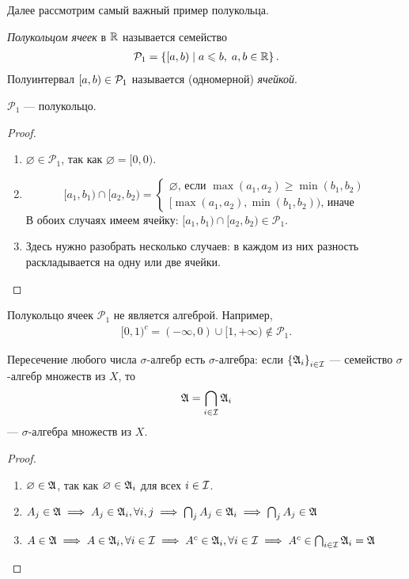 Далее рассмотрим самый важный пример полукольца.

\begin{df}
 \textit{Полукольцом ячеек} в $\mathbb{R}$ называется семейство 
 \begin{align*}
  \mathcal{P}_1 = \left\{ [a, b) \mid a \leqslant b,\; a, b \in \mathbb{R} \right\} 
 .\end{align*} Полуинтервал $[a, b) \in \mathcal{P}_1$ называется (одномерной) \textit{ячейкой}.
\end{df}
\begin{lm}
 $ \mathcal{P}_1 $ --- полукольцо.
\end{lm}
\begin{proof}\
 \begin{enumerate}
  \item $ \varnothing \in \mathcal{P}_1 $, так как $ \varnothing = [0, 0) $.
  \item $$
   [a_1, b_1) \cap [a_2, b_2) = 
   \begin{cases}
    \varnothing \text{, если } \max(a_1, a_2) \geqslant \min(b_1, b_2) \\
    [\max(a_1, a_2), \min(b_1, b_2) ) \text{, иначе}
   \end{cases}
   $$
   В обоих случаях имеем ячейку: $[a_1, b_1) \cap [a_2, b_2) \in \mathcal{P}_1 $.
  \item Здесь нужно разобрать несколько случаев: в каждом из них разность раскладывается на одну или две ячейки.
 \end{enumerate}
\end{proof}
\begin{remrk*}
 Полукольцо ячеек $ \mathcal{P}_1 $ не является алгеброй.
 Например, 
\begin{align*}
 [0, 1)^c = (-\infty, 0) \cup [1, +\infty) \not \in  \mathcal{P}_1.
\end{align*}
\end{remrk*}
\begin{lm}
 Пересечение любого числа $\sigma$-алгебр есть $\sigma$-алгебра: если $\left\{\mathfrak{A}_i\right\}_{i \in \mathcal{I}}$  --- семейство $\sigma$-алгебр множеств из $X$, то
 \begin{align*}
  \mathfrak{A} = \bigcap_{i \in \mathcal{I}} \mathfrak{A}_i
 \end{align*} --- $\sigma$-алгебра множеств из $X$.
\end{lm}
\begin{proof}\
 \begin{enumerate}
  \item $ \varnothing \in \mathfrak{A} $, так как $ \varnothing \in \mathfrak{A}_i $ для всех $ i \in \mathcal{I} $.
  \item $ A_j \in \mathfrak{A} \;\Longrightarrow\; A_j \in \mathfrak{A}_i, \forall i, j  \;\Longrightarrow\; \bigcap_j A_j \in 
   \mathfrak{A}_i \;\Longrightarrow\; \bigcap_j A_j \in \mathfrak{A}$
  \item $ A \in \mathfrak{A} \;\Longrightarrow\; A \in \mathfrak{A}_i,  \forall i \in \mathcal{I} \;\Longrightarrow\; A^c \in \mathfrak{A}_i, \forall i \in \mathcal{I} \;\Longrightarrow\; A^c \in \bigcap_{i \in \mathcal{I}} \mathfrak{A}_i = \mathfrak{A}$ 
 \end{enumerate}
\end{proof}
